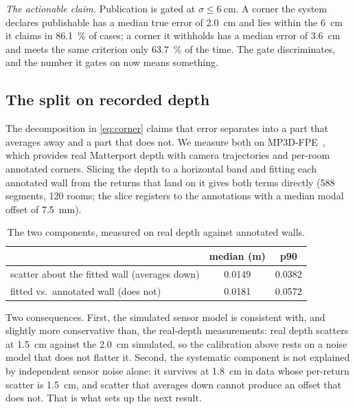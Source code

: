\documentclass[conference,letterpaper,10pt]{IEEEtran}
\begin{document}
\emph{The actionable claim.} Publication is gated at $\sigma \le \SI{6}{\centi\meter}$. A corner the
system declares publishable has a median true error of \SI{2.0}{\centi\meter} and lies within the
\SI{6}{\centi\meter} it claims in \SI{86.1}{\percent} of cases; a corner it withholds has a median
error of \SI{3.6}{\centi\meter} and meets the same criterion only \SI{63.7}{\percent} of the
time.
The gate discriminates, and the number it gates on now means something.

\subsection{The split on recorded depth}
\label{sec:real}

The decomposition in \eqref{eq:corner} claims that error separates into a part that averages away and
a part that does not. We measure both on MP3D-FPE~\cite{solarte2022dfpe}, which provides
real Matterport depth with camera trajectories and per-room annotated corners. Slicing the depth to a
horizontal band and fitting each annotated wall from the returns that land on it gives both terms
directly (588 segments, 120 rooms; the slice registers to the annotations with a median modal offset
of \SI{7.5}{\milli\meter}).

\begin{table}[t]
\centering
\caption{The two components, measured on real depth against annotated walls.}
\label{tab:real}
\setlength{\tabcolsep}{3pt}
\begin{tabular}{lSS}
\toprule
& {median (\si{\meter})} & {p90} \\
\midrule
scatter about the fitted wall (averages down) & 0.0149 & 0.0382 \\
fitted vs.\ annotated wall (does not) & 0.0181 & 0.0572 \\
\bottomrule
\end{tabular}
\end{table}

Two consequences. First, the simulated sensor model is consistent with, and slightly more
conservative than, the real-depth measurements: real depth scatters at \SI{1.5}{\centi\meter} against
the \SI{2.0}{\centi\meter} simulated, so the calibration above rests on a noise model that does not
flatter it. Second, the
systematic component is not explained by independent sensor noise alone: it survives at
\SI{1.8}{\centi\meter} in data whose per-return scatter is \SI{1.5}{\centi\meter}, and scatter that
averages down cannot produce an offset that does not. That is what sets up the next result.
\end{document}
